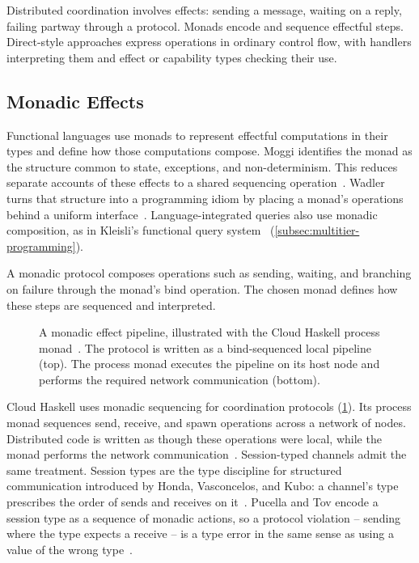 Distributed coordination involves effects:
sending a message, waiting on a reply, failing partway through a protocol.
%
Monads encode and sequence effectful steps.
Direct-style approaches express operations in ordinary control flow,
with handlers interpreting them and effect or capability types checking their use.

\subsection{Monadic Effects}
\label{subsec:monadic-effects}

Functional languages use monads to represent effectful computations in their types and define how those computations compose.
%
Moggi identifies the monad as the structure common to state, exceptions, and non-determinism.
This reduces separate accounts of these effects to a shared sequencing operation~\cite{DBLP:journals/iandc/Moggi91}.
Wadler turns that structure into a programming idiom by placing a monad's operations behind a uniform interface~\cite{DBLP:conf/popl/Wadler92}.
%
Language-integrated queries also use monadic composition,
as in Kleisli's functional query system~\cite{wong2000kleisli} (\cref{subsec:multitier-programming}).

A monadic protocol composes operations such as sending,
waiting,
and branching on failure through the monad's bind operation.
The chosen monad defines how these steps are sequenced and interpreted.

\begin{figure}
    \centering
    
    \caption[A monadic effect pipeline]{A monadic effect pipeline, illustrated with the Cloud Haskell process monad~\cite{DBLP:conf/haskell/EpsteinBJ11}.
    The protocol is written as a bind-sequenced local pipeline (top).
    The process monad executes the pipeline on its host node and performs the required network communication (bottom).}
    \label{fig:monadic-pipeline}
\end{figure}

Cloud Haskell uses monadic sequencing for coordination protocols (\cref{fig:monadic-pipeline}).
Its process monad sequences send, receive, and spawn operations across a network of nodes.
Distributed code is written as though these operations were local, while the monad performs the network communication~\cite{DBLP:conf/haskell/EpsteinBJ11}.
%
Session-typed channels admit the same treatment.
%
Session types are the type discipline for structured communication introduced by Honda, Vasconcelos, and Kubo:
a channel's type prescribes the order of sends and receives on it~\cite{DBLP:conf/esop/HondaVK98}.
%
Pucella and Tov encode a session type as a sequence of monadic actions,
so a protocol violation -- sending where the type expects a receive -- is a type error in the same sense as using a value of the wrong type~\cite{DBLP:conf/haskell/PucellaT08}.

